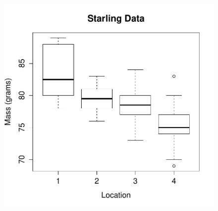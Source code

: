 \begin{figure}[ht!]
\begin{center}
\includegraphics[scale=0.6]{Figures/starling.pdf}
\end{center}
\end{figure}



